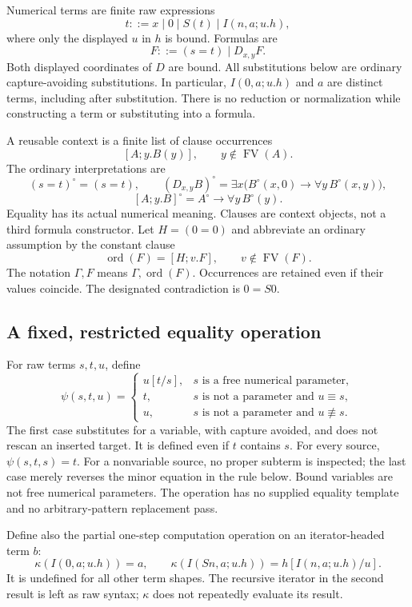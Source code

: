 \documentclass[11pt,letterpaper]{article}
\begin{document}
Numerical terms are finite raw expressions
\[
 t::=x\mid0\mid S(t)\mid I(n,a;u.h),
\]
where only the displayed $u$ in $h$ is bound.  Formulas are
\[
 F::=(s=t)\mid D_{x,y}F.
\]
Both displayed coordinates of $D$ are bound.  All substitutions below
are ordinary capture-avoiding substitutions.  In particular,
$I(0,a;u.h)$ and $a$ are distinct terms, including after substitution.
There is no reduction or normalization while constructing a term or
substituting into a formula.

A reusable context is a finite list of clause occurrences
\[
 [A;y.B(y)],\qquad y\notin\operatorname{FV}(A).
\]
The ordinary interpretations are
\[
 (s=t)^\circ=(s=t),\qquad
 (D_{x,y}B)^\circ
   =\exists x\bigl(B^\circ(x,0)\to\forall y\,B^\circ(x,y)\bigr),
\]
\[
 [A;y.B]^\circ=A^\circ\to\forall y\,B^\circ(y).
\]
Equality has its actual numerical meaning.  Clauses are context objects,
not a third formula constructor.  Let $H=(0=0)$ and abbreviate an ordinary
assumption by the constant clause
\[
 \operatorname{ord}(F)=[H;v.F],\qquad v\notin\operatorname{FV}(F).
\]
The notation $\Gamma,F$ means $\Gamma,\operatorname{ord}(F)$.
Occurrences are retained even if their values coincide.  The designated
contradiction is $0=S0$.

\subsection{A fixed, restricted equality operation}

For raw terms $s,t,u$, define
\[
 \psi(s,t,u)=
 \begin{cases}
 u[t/s],&s\text{ is a free numerical parameter},\\
 t,&s\text{ is not a parameter and }u\equiv s,\\
 u,&s\text{ is not a parameter and }u\not\equiv s.
 \end{cases}
\]
The first case substitutes for a variable, with capture avoided, and does
not rescan an inserted target.  It is defined even if $t$ contains $s$.
For every source, $\psi(s,t,s)=t$.  For a nonvariable source, no proper
subterm is inspected; the last case merely reverses the minor equation
in the rule below.  Bound variables are not free numerical parameters.
The operation has no supplied equality template and no arbitrary-pattern
replacement pass.

Define also the partial one-step computation operation on an
iterator-headed term $b$:
\[
 \kappa(I(0,a;u.h))=a,\qquad
 \kappa(I(Sn,a;u.h))=h[I(n,a;u.h)/u].
\]
It is undefined for all other term shapes.  The recursive iterator in
the second result is left as raw syntax; $\kappa$ does not repeatedly
evaluate its result.
\end{document}
